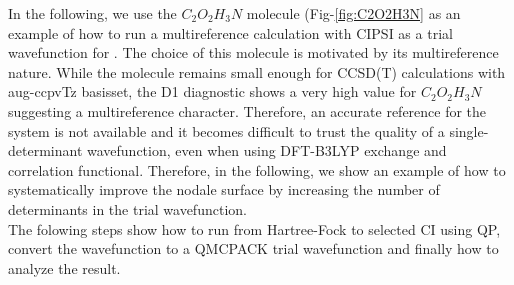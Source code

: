 In the following, we use the $C_2O_2H_3N$ molecule (Fig-\ref{fig:C2O2H3N} as an example of how to run a multireference calculation with CIPSI as a trial wavefunction for \qmcpack. The choice of this molecule is motivated by its multireference nature. While the molecule remains small enough for CCSD(T) calculations with aug-ccpvTz basisset, the D1 diagnostic shows a very high value for  $C_2O_2H_3N$ suggesting a multireference character.  Therefore, an accurate reference for the system is not available and it becomes difficult to trust the quality of a single-determinant wavefunction, even when using DFT-B3LYP exchange and correlation functional. Therefore, in the following, we show an example of how to systematically improve the nodale surface by increasing the number of determinants in the trial wavefunction.\\
The folowing steps show how to run from Hartree-Fock to selected CI using QP, convert the wavefunction to a QMCPACK trial wavefunction and finally how to analyze the result.

